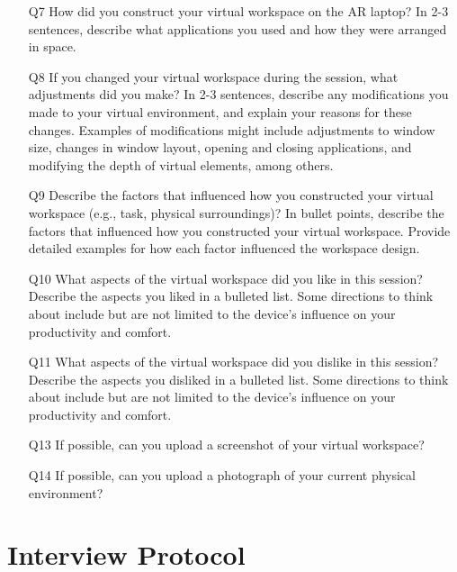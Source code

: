 \begin{enumerate}
\item[Q7] How did you construct your virtual workspace on the AR laptop? 
In 2-3 sentences, describe what applications you used and how they were arranged in space.

\item[Q8] If you changed your virtual workspace during the session, what adjustments did you make?
In 2-3 sentences, describe any modifications you made to your virtual environment, and explain your reasons for these changes. Examples of modifications might include adjustments to window size, changes in window layout, opening and closing applications, and modifying the depth of virtual elements, among others.

\item[Q9] Describe the factors that influenced how you constructed your virtual workspace (e.g., task, physical surroundings)?
In bullet points, describe the factors that influenced how you constructed your virtual workspace. Provide detailed examples for how each factor influenced the workspace design.

\item[Q10] What aspects of the virtual workspace did you like in this session?
Describe the aspects you liked in a bulleted list. Some directions to think about include but are not limited to the device's influence on your productivity and comfort.

\item[Q11] What aspects of the virtual workspace did you dislike in this session?
Describe the aspects you disliked in a bulleted list. Some directions to think about include but are not limited to the device's influence on your productivity and comfort.


\item[Q13] If possible, can you upload a screenshot of your virtual workspace?

\item[Q14] If possible, can you upload a photograph of your current physical environment? 
\end{enumerate}

\section{Interview Protocol}


